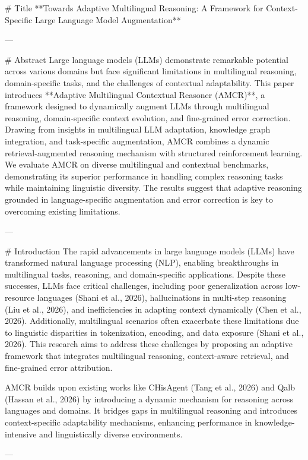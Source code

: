# Title  
**Towards Adaptive Multilingual Reasoning: A Framework for Context-Specific Large Language Model Augmentation**

---

# Abstract  
Large language models (LLMs) demonstrate remarkable potential across various domains but face significant limitations in multilingual reasoning, domain-specific tasks, and the challenges of contextual adaptability. This paper introduces **Adaptive Multilingual Contextual Reasoner (AMCR)**, a framework designed to dynamically augment LLMs through multilingual reasoning, domain-specific context evolution, and fine-grained error correction. Drawing from insights in multilingual LLM adaptation, knowledge graph integration, and task-specific augmentation, AMCR combines a dynamic retrieval-augmented reasoning mechanism with structured reinforcement learning. We evaluate AMCR on diverse multilingual and contextual benchmarks, demonstrating its superior performance in handling complex reasoning tasks while maintaining linguistic diversity. The results suggest that adaptive reasoning grounded in language-specific augmentation and error correction is key to overcoming existing limitations.  

---

# Introduction  
The rapid advancements in large language models (LLMs) have transformed natural language processing (NLP), enabling breakthroughs in multilingual tasks, reasoning, and domain-specific applications. Despite these successes, LLMs face critical challenges, including poor generalization across low-resource languages (Shani et al., 2026), hallucinations in multi-step reasoning (Liu et al., 2026), and inefficiencies in adapting context dynamically (Chen et al., 2026). Additionally, multilingual scenarios often exacerbate these limitations due to linguistic disparities in tokenization, encoding, and data exposure (Shani et al., 2026). This research aims to address these challenges by proposing an adaptive framework that integrates multilingual reasoning, context-aware retrieval, and fine-grained error attribution.  

AMCR builds upon existing works like CHisAgent (Tang et al., 2026) and Qalb (Hassan et al., 2026) by introducing a dynamic mechanism for reasoning across languages and domains. It bridges gaps in multilingual reasoning and introduces context-specific adaptability mechanisms, enhancing performance in knowledge-intensive and linguistically diverse environments.

---

